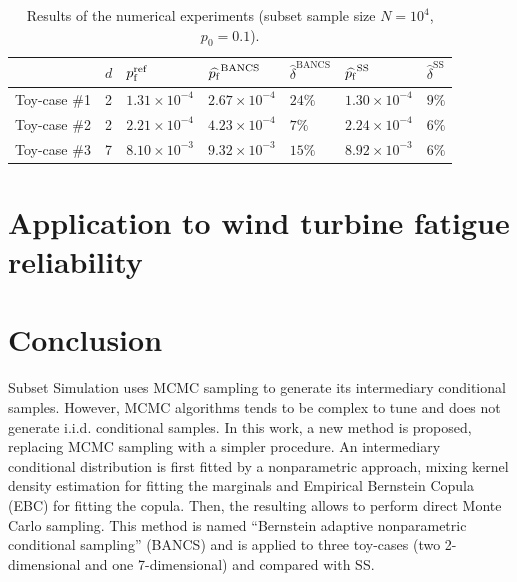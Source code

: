 \begin{table}[h]
    \centering
    \caption{Results of the numerical experiments (subset sample size $N=10^4$, $p_0=0.1$).}
    \begin{tabular}{|l|l|l||l|l||l|l|}\hline
     & $d$ & $p_\mathrm{f}^{\mathrm{ref}}$ & $\widehat{p_\mathrm{f}}^{\mathrm{BANCS}}$ & $\widehat{\delta}^{\mathrm{BANCS}}$ & $\widehat{p_\mathrm{f}}^{\mathrm{SS}}$ & $\widehat{\delta}^{\mathrm{SS}}$\\
    \hline
    Toy-case \#1 & 2 & $1.31 \times 10^{-4}$ & $2.67 \times 10^{-4}$ & $24 \%$ & $1.30 \times 10^{-4}$ & $9 \%$\\
    \hline
    Toy-case \#2 & 2 & $2.21 \times 10^{-4}$ & $4.23 \times 10^{-4}$ & $7 \%$ & $2.24 \times 10^{-4}$ & $6 \%$\\
    \hline
    Toy-case \#3 & 7 & $8.10 \times 10^{-3}$ & $9.32 \times 10^{-3}$ & $15 \%$ & $8.92 \times 10^{-3}$ & $6 \%$\\ \hline
    \end{tabular}
    \label{tab:result_table}
\end{table}



\section{Application to wind turbine fatigue reliability}


\section{Conclusion}

Subset Simulation uses MCMC sampling to generate its intermediary conditional samples. 
However, MCMC algorithms tends to be complex to tune and does not generate i.i.d. conditional samples. 
In this work, a new method is proposed, replacing MCMC sampling with a simpler procedure. 
An intermediary conditional distribution is first fitted by a nonparametric approach, mixing kernel density estimation for fitting the marginals and Empirical Bernstein Copula (EBC) for fitting the copula. 
Then, the resulting allows to perform direct Monte Carlo sampling. 
This method is named ``Bernstein adaptive nonparametric conditional sampling'' (BANCS) and is applied to three toy-cases (two 2-dimensional and one 7-dimensional) and compared with SS.

